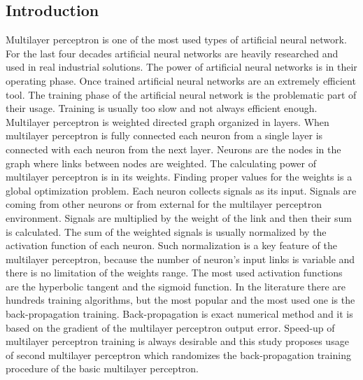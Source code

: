 \documentclass[a0,portrait,25pt]{sciposter}
\begin{document}
\begin{mdframed}[backgroundcolor=white,roundcorner=4pt,shadow=true,linewidth=1pt]
\color{Black}
\section*{Introduction}
Multilayer perceptron is one of the most used types of artificial neural network. For the last four decades artificial neural networks are heavily researched and used in real industrial solutions. The power of artificial neural networks is in their operating phase. Once trained artificial neural networks are an extremely efficient tool. The training phase of the artificial neural network is the problematic part of their usage. Training is usually too slow and not always efficient enough. Multilayer perceptron is weighted directed graph organized in layers. When multilayer perceptron is fully connected each neuron from a single layer is connected with each neuron from the next layer. Neurons are the nodes in the graph where links between nodes are weighted. The calculating power of multilayer perceptron is in its weights. Finding proper values for the weights is a global optimization problem. Each neuron collects signals as its input. Signals are coming from other neurons or from external for the multilayer perceptron environment. Signals are multiplied by the weight of the link and then their sum is calculated. The sum of the weighted signals is usually normalized by the activation function of each neuron. Such normalization is a key feature of the multilayer perceptron, because the number of neuron's input links is variable and there is no limitation of the weights range. The most used activation functions are the hyperbolic tangent and the sigmoid function.  In the literature there are hundreds training algorithms, but the most popular and the most used one is the back-propagation training. Back-propagation is exact numerical method and it is based on the gradient of the multilayer perceptron output error. Speed-up of multilayer perceptron training is always desirable and this study proposes usage of second multilayer perceptron which randomizes the back-propagation training procedure of the basic multilayer perceptron. 
\end{mdframed}
\end{document}
